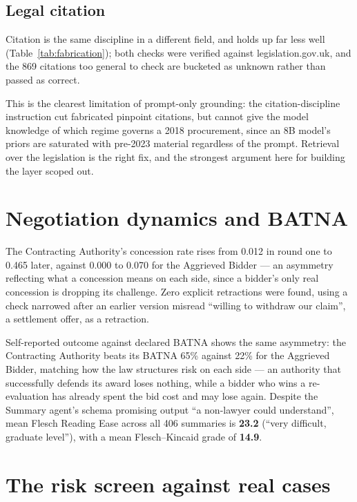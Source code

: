 \subsection{Legal citation}
\label{sec:citation}

Citation is the same discipline in a different field, and holds up far
less well (Table~\ref{tab:fabrication}); both checks were verified against
legislation.gov.uk, and the 869 citations too general to check are
bucketed as unknown rather than passed as correct.

This is the clearest limitation of prompt-only grounding: the
citation-discipline instruction cut fabricated pinpoint citations, but
cannot give the model knowledge of which regime governs a 2018 procurement,
since an 8B model's priors are saturated with pre-2023 material regardless
of the prompt. Retrieval \cite{lewis2020rag} over the legislation is the
right fix, and the strongest argument here for building the layer scoped
out.

\section{Negotiation dynamics and BATNA}
\label{sec:dynamics}

The Contracting Authority's concession rate rises from 0.012 in round one
to 0.465 later, against 0.000 to 0.070 for the Aggrieved Bidder --- an
asymmetry reflecting what a concession means on each side, since a
bidder's only real concession is dropping its challenge. Zero explicit
retractions were found, using a check narrowed after an earlier version
misread ``willing to withdraw our claim'', a settlement offer, as a
retraction.

Self-reported outcome against declared BATNA shows the same asymmetry: the
Contracting Authority beats its BATNA 65\% against 22\% for the Aggrieved
Bidder, matching how the law structures risk on each side --- an
authority that successfully defends its award loses nothing, while a
bidder who wins a re-evaluation has already spent the bid cost and may lose
again. Despite the Summary agent's schema promising output ``a non-lawyer
could understand'', mean Flesch Reading Ease \cite{flesch1948readability}
across all 406 summaries is \textbf{23.2} (``very difficult, graduate
level''), with a mean Flesch--Kincaid grade \cite{kincaid1975derivation} of
\textbf{14.9}.

\section{The risk screen against real cases}
\label{sec:risk-eval}

